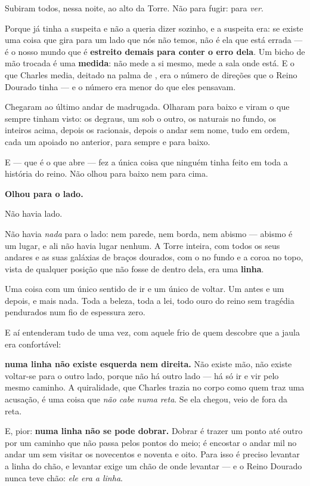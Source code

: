 \documentclass[livro.tex]{subfiles}
\begin{document}
Subiram todos, nessa noite, ao alto da Torre. Não para fugir: para \emph{ver}.

Porque \Drk já tinha a suspeita e não a queria dizer sozinho, e a suspeita era: se existe uma
coisa que gira para um lado que nós não temos, não é ela que está errada --- é o nosso mundo que
é \textbf{estreito demais para conter o erro dela}. Um bicho de mão trocada é uma
\textbf{medida}: não mede a si mesmo, mede a sala onde está. E o que Charles media, deitado na
palma de \Joa , era o número de direções que o Reino Dourado tinha --- e o número era menor do
que eles pensavam.

\medskip

Chegaram ao último andar de madrugada. Olharam para baixo e viram o que sempre tinham visto: os
degraus, um sob o outro, os naturais no fundo, os inteiros acima, depois os racionais, depois o andar sem nome, tudo em
ordem, cada um apoiado no anterior, para sempre e para baixo.

E \Ben --- que é o que abre --- fez a única coisa que ninguém tinha feito em toda a história do
reino. Não olhou para baixo nem para cima.

\textbf{Olhou para o lado.}

\medskip

Não havia lado.

Não havia \emph{nada} para o lado: nem parede, nem borda, nem abismo --- abismo é um lugar, e ali
não havia lugar nenhum. A Torre inteira, com todos os seus andares e as suas galáxias de braços
dourados, com o \Opr no fundo e a coroa no topo, vista de qualquer posição que não fosse de
dentro dela, era uma \textbf{linha}.

Uma coisa com um único sentido de ir e um único de voltar. Um antes e um depois, e mais nada.
Toda a beleza, toda a lei, todo ouro do reino sem tragédia pendurados num fio de espessura
zero.

\medskip

E aí entenderam tudo de uma vez, com aquele frio de quem descobre que a jaula era confortável:

\textbf{numa linha não existe esquerda nem direita.} Não existe mão, não existe voltar-se para o
outro lado, porque não há outro lado --- há só ir e vir pelo mesmo caminho. A quiralidade, que
Charles trazia no corpo como quem traz uma acusação, é uma coisa que \emph{não cabe numa reta}.
Se ela chegou, veio de fora da reta.

E, pior: \textbf{numa linha não se pode dobrar.} Dobrar é trazer um ponto até outro por um
caminho que não passa pelos pontos do meio; é encostar o andar mil no andar um sem visitar os
novecentos e noventa e oito. Para isso é preciso levantar a linha do chão, e levantar exige um
chão de onde levantar --- e o Reino Dourado nunca teve chão: \emph{ele era a linha}.
\end{document}
